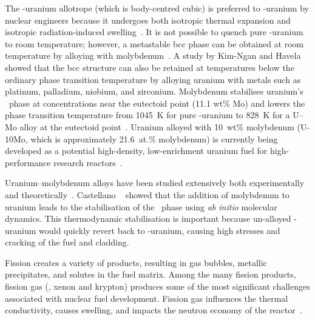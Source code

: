 The \mbox{\textgamma-uranium} allotrope (which is body-centred cubic) is
preferred to \mbox{\textalpha-uranium} by nuclear engineers because it
undergoes both isotropic thermal expansion and isotropic radiation-induced
swelling~\cite{kittel1993history}.
It is not possible to quench pure \mbox{\textgamma-uranium} to room
temperature; however, a metastable bcc phase can be obtained at room
temperature by alloying with
molybdenum~\cite{wilson1949structures, sinha2010phase,
    yakel1969crystal,sinha2010effect}.
A study by Kim-Ngan and Havela~\cite{kim2016superconductivity} showed that the
bcc structure can also be retained at temperatures below the ordinary phase
transition temperature by alloying uranium with metals such as platinum,
palladium, niobium, and zirconium.
Molybdenum stabilises uranium's \textgamma\ phase at concentrations near the
eutectoid point (11.1 wt\% Mo) and lowers the phase transition temperature from
1045~K for pure \textgamma-uranium to 828~K for a U--Mo alloy at the eutectoid
point~\cite{ASM-Alloy-Mo,Berche2011}.
Uranium alloyed with 10~wt\% molybdenum (U-10Mo, which is approximately
21.6~at.\% molybdenum) is currently being developed as a potential
high-density, low-enrichment uranium fuel for high-performance research
reactors~\cite{prabhakaran2017u, meyer2014irradiation, williams2017post}.

Uranium--molybdenum alloys have been studied extensively both
experimentally~\cite{dwight1960uranium,tangri1961metastable, sinha2010phase}
and theoretically~\cite{berche2011calphad,zhang2010thermodynamic,
    losada2019ground, landa2011density,alonso2007role}.
Castellano \etal~\cite{castellano2020thermodynamic} showed that the
addition of molybdenum to uranium leads to the stabilisation of the
\textgamma\ phase using \textit{ab initio} molecular dynamics.
This thermodynamic stabilisation is important because un-alloyed
\textgamma-uranium would quickly revert back to \textalpha-uranium, causing high stresses and
cracking of the fuel and cladding. %

Fission creates a variety of products, resulting in gas bubbles,
metallic precipitates, and solutes in the fuel matrix.
Among the many fission products, fission gas (\ie, xenon and krypton) produces
some of the most significant challenges associated with nuclear fuel
development. Fission gas influences the thermal conductivity,
causes swelling, and impacts the neutron economy of the
reactor~\cite{rondinella2010high,iasir2018estimation}. 

